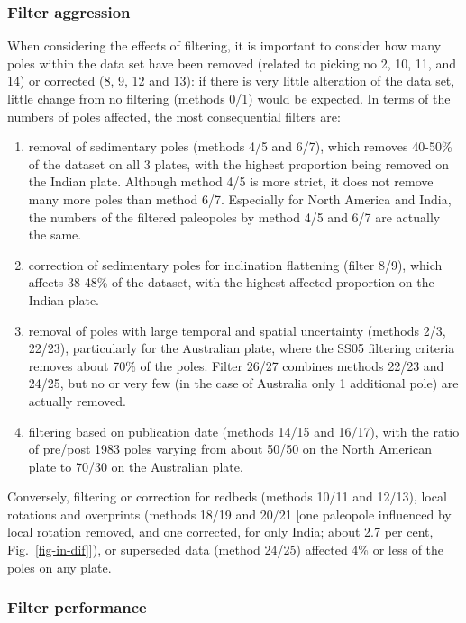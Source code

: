 \subsubsection{Filter aggression}

When considering the effects of filtering, it is important to consider how many
poles within the data set have been removed (related to picking no
2, 10, 11, and 14) or corrected (8, 9, 12 and 13): if
there is very little alteration of the data set, little change from no filtering
(methods 0/1) would be expected. In terms of the numbers of poles affected, the
most consequential filters are:
%
\begin{enumerate}
  \item removal of sedimentary poles (methods 4/5 and 6/7), which removes
        40-50\% of the dataset on all 3 plates, with the highest proportion
		being removed on the Indian plate. Although method 4/5 is more strict,
		it does not remove many more poles than method 6/7. Especially for North
		America and India, the numbers of the filtered paleopoles by method 4/5
		and 6/7 are actually the same.
  \item correction of sedimentary poles for inclination flattening (filter
		8/9), which affects 38-48\% of the dataset, with the highest affected
		proportion on the Indian plate.
  \item removal of poles with large temporal and spatial uncertainty (methods
		2/3, 22/23), particularly for the Australian plate, where the SS05
		filtering criteria removes about 70\% of the poles. Filter 26/27
		combines methods 22/23 and 24/25, but no or very few (in the case of
		Australia only 1 additional pole) are actually removed.
  \item filtering based on publication date (methods 14/15 and 16/17), with the
		ratio of pre/post 1983 poles varying from about 50/50 on the North
		American plate to 70/30 on the Australian plate.
\end{enumerate}

Conversely, filtering or correction for redbeds (methods 10/11 and 12/13), local
rotations and overprints (methods 18/19 and 20/21 [one paleopole influenced by
local rotation removed, and one corrected, for only India; about 2.7 per cent,
Fig.~\ref{fig-in-dif}]), or superseded data (method 24/25) affected 4\% or less
of the poles on any plate.

\subsubsection{Filter performance}

